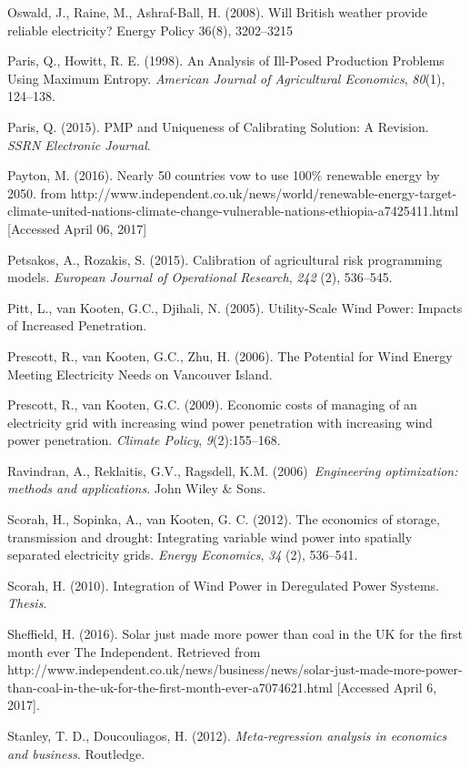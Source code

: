 Oswald, J., Raine, M., Ashraf-Ball, H. (2008). Will British weather
provide reliable electricity? Energy Policy 36(8), 3202--3215

Paris, Q., Howitt, R. E. (1998). An Analysis of Ill-Posed Production
Problems Using Maximum Entropy. \emph{American Journal of Agricultural
Economics}, \emph{80}(1), 124--138.

Paris, Q. (2015). PMP and Uniqueness of Calibrating Solution: A
Revision. \emph{SSRN Electronic Journal}.

Payton, M. (2016). Nearly 50 countries vow to use 100\% renewable energy
by 2050. from
http://www.independent.co.uk/news/world/renewable-energy-target-climate-united-nations-climate-change-vulnerable-nations-ethiopia-a7425411.html
{[}Accessed April 06, 2017{]}

Petsakos, A., Rozakis, S. (2015). Calibration of agricultural risk
programming models. \emph{European Journal of Operational Research},
\emph{242} (2), 536--545.

Pitt, L., van Kooten, G.C., Djihali, N. (2005). Utility-Scale Wind
Power: Impacts of Increased Penetration.

Prescott, R., van Kooten, G.C., Zhu, H. (2006). The Potential for Wind
Energy Meeting Electricity Needs on Vancouver Island.

Prescott, R., van Kooten, G.C. (2009). Economic costs of managing of an
electricity grid with increasing wind power penetration with increasing
wind power penetration. \emph{Climate Policy}, \emph{9}(2):155--168.

Ravindran, A., Reklaitis, G.V., Ragsdell, K.M. (2006)~\emph{Engineering
optimization: methods and applications}. John Wiley \& Sons.

Scorah, H., Sopinka, A., van Kooten, G. C. (2012). The economics of
storage, transmission and drought: Integrating variable wind power into
spatially separated electricity grids. \emph{Energy Economics},
\emph{34} (2), 536--541.

Scorah, H. (2010). Integration of Wind Power in Deregulated Power
Systems. \emph{Thesis}.

Sheffield, H. (2016). Solar just made more power than coal in the UK for
the first month ever \textbar{} The Independent. Retrieved from
http://www.independent.co.uk/news/business/news/solar-just-made-more-power-than-coal-in-the-uk-for-the-first-month-ever-a7074621.html
{[}Accessed April 6, 2017{]}.

Stanley, T. D., Doucouliagos, H. (2012). \emph{Meta-regression analysis
in economics and business}. Routledge.

